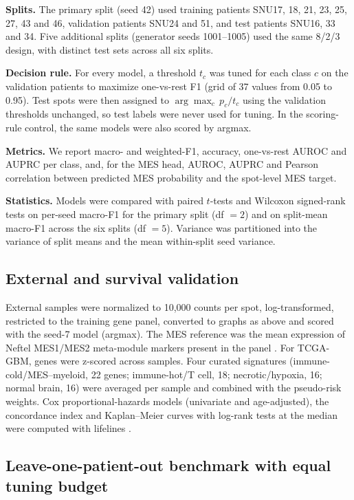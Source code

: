 \documentclass[11pt,letterpaper]{article}
\begin{document}
\textbf{Splits.} The primary split (seed 42) used training patients SNU17, 18, 21, 23, 25, 27, 43 and 46, validation patients SNU24 and 51, and test patients SNU16, 33 and 34. Five additional splits (generator seeds 1001--1005) used the same 8/2/3 design, with distinct test sets across all six splits.

\textbf{Decision rule.} For every model, a threshold $t_c$ was tuned for each class $c$ on the validation patients to maximize one-vs-rest F1 (grid of 37 values from 0.05 to 0.95). Test spots were then assigned to $\arg\max_c\, p_c / t_c$ using the validation thresholds unchanged, so test labels were never used for tuning. In the scoring-rule control, the same models were also scored by argmax.

\textbf{Metrics.} We report macro- and weighted-F1, accuracy, one-vs-rest AUROC and AUPRC per class, and, for the MES head, AUROC, AUPRC and Pearson correlation between predicted MES probability and the spot-level MES target.

\textbf{Statistics.} Models were compared with paired $t$-tests and Wilcoxon signed-rank tests on per-seed macro-F1 for the primary split (df $= 2$) and on split-mean macro-F1 across the six splits (df $= 5$). Variance was partitioned into the variance of split means and the mean within-split seed variance.

\subsection{External and survival validation}

External samples were normalized to 10{,}000 counts per spot, log-transformed, restricted to the training gene panel, converted to graphs as above and scored with the seed-7 model (argmax). The MES reference was the mean expression of Neftel MES1/MES2 meta-module markers present in the panel \cite{neftel2019}. For TCGA-GBM, genes were z-scored across samples. Four curated signatures (immune-cold/MES--myeloid, 22 genes; immune-hot/T cell, 18; necrotic/hypoxia, 16; normal brain, 16) were averaged per sample and combined with the pseudo-risk weights. Cox proportional-hazards models (univariate and age-adjusted), the concordance index and Kaplan--Meier curves with log-rank tests at the median were computed with lifelines \cite{davidsonpilon2019}.

\subsection{Leave-one-patient-out benchmark with equal tuning budget}
\end{document}
